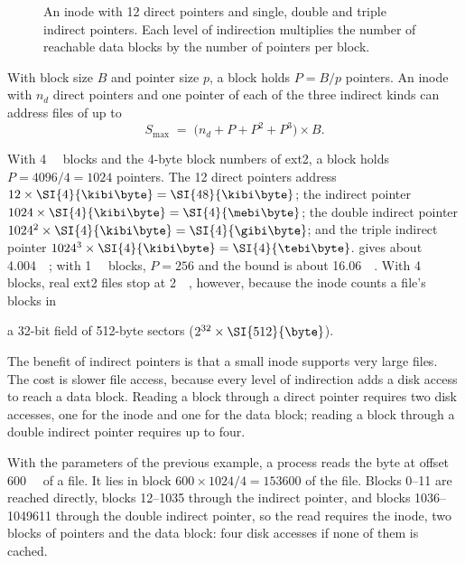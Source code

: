 \documentclass[../main.tex]{subfiles}
\begin{document}
\begin{figure}[htbp]
  \centering
  
  \caption{An inode with 12 direct pointers and single, double and triple
    indirect pointers.  Each level of indirection multiplies the number of
    reachable data blocks by the number of pointers per block.}
  \label{fig:l11-inode}
\end{figure}

With block size $B$ and pointer size $p$, a block holds $P = B/p$ pointers.
An inode with $n_d$ direct pointers and one pointer of each of the three
indirect kinds can address files of up to
\begin{equation}
  S_{\max} \;=\; \bigl(n_d + P + P^2 + P^3\bigr) \times B .
  \label{eq:l11-max-size}
\end{equation}

\begin{example}
  With \SI{4}{\kibi\byte} blocks and the 4-byte block numbers of ext2, a
  block holds $P = 4096/4 = 1024$ pointers.  The 12 direct pointers address
  $12 \times \SI{4}{\kibi\byte} = \SI{48}{\kibi\byte}$; the indirect pointer
  $1024 \times \SI{4}{\kibi\byte} = \SI{4}{\mebi\byte}$; the double indirect
  pointer $1024^2 \times \SI{4}{\kibi\byte} = \SI{4}{\gibi\byte}$; and the
  triple indirect pointer $1024^3 \times \SI{4}{\kibi\byte} =
  \SI{4}{\tebi\byte}$.   gives about
  \SI{4.004}{\tebi\byte}; with \SI{1}{\kibi\byte} blocks, $P = 256$ and the
  bound is about \SI{16.06}{\gibi\byte}.  With \SI{4}{\kibi\byte} blocks,
  real ext2 files stop at \SI{2}{\tebi\byte}, however, because the inode
  counts a file's blocks in

  a 32-bit field of 512-byte sectors ($2^{32} \times \SI{512}{\byte}$).
\end{example}

The benefit of indirect pointers is that a small inode supports very large
files.  The cost is slower file access, because every level of indirection
adds a disk access to reach a data block.  Reading a block through a direct
pointer requires two disk accesses, one for the inode and one for the data
block; reading a block through a double indirect pointer requires up to
four.

\begin{example}
  With the parameters of the previous example, a process reads the byte at
  offset \SI{600}{\mebi\byte} of a file.  It lies in block
  $600 \times 1024 / 4 = \num{153600}$ of the file.  Blocks 0--11 are reached
  directly, blocks 12--\num{1035} through the indirect pointer, and blocks
  \num{1036}--\num{1049611} through the double indirect pointer, so the read
  requires the inode, two blocks of pointers and the data block: four disk
  accesses if none of them is cached.
\end{example}
\end{document}

